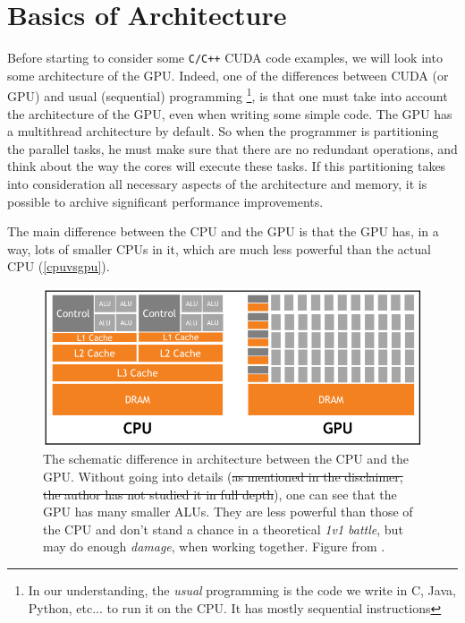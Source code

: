 
\section{Basics of Architecture}

Before starting to consider some \verb|C/C++| CUDA code examples, we will look into some architecture of the GPU. 
Indeed, one of the differences between CUDA (or GPU) and usual (sequential) programming \footnote{In our understanding, the
\textit{usual} programming is the code we write in C, Java, Python, etc... to run it on the CPU. It has mostly sequential instructions}, 
is that one must take into account
the architecture of the GPU, even when writing some simple code. The GPU has a multithread architecture by default. 
So when the programmer is partitioning the parallel tasks, he must make sure that there are no redundant
operations, and think about the way the cores will execute these tasks. If this partitioning takes into consideration all necessary aspects of the architecture and memory, it is possible to archive significant performance improvements.


The main difference between the CPU and the GPU is that the GPU has, in a way, lots of smaller CPUs in it, which 
are much less powerful than the actual CPU (\autoref{cpuvsgpu}).
\cite{tuomanen2018hands}

\begin{figure}
   \centering
   \includegraphics[scale=0.4]{pngs/cpuvsgpu.png}
   \caption{The schematic difference in architecture between the CPU and the GPU. Without going into details 
   (\sout{as mentioned in the disclaimer, the author has not studied it in full depth}), one can see that 
   the GPU has many smaller ALUs. They are less powerful than those of the CPU and don't stand a chance in 
    a theoretical \textit{1v1 battle}, but may do enough \textit{damage}, when working together. Figure from \cite{tuomanen2018hands}.}
   \label{cpuvsgpu}
\end{figure}

